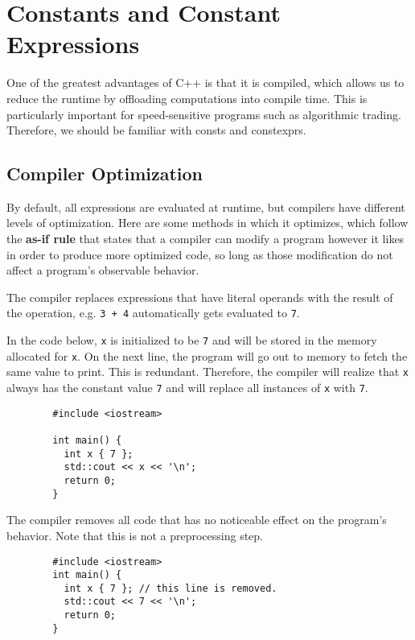 \documentclass{article}
\begin{document}
\section{Constants and Constant Expressions}

    One of the greatest advantages of C++ is that it is compiled, which allows us to reduce the runtime by offloading computations into compile time. This is particularly important for speed-sensitive programs such as algorithmic trading. Therefore, we should be familiar with consts and constexprs. 

  \subsection{Compiler Optimization} 

    By default, all expressions are evaluated at runtime, but compilers have different levels of optimization. Here are some methods in which it optimizes, which follow the \textbf{as-if rule} that states that a compiler can modify a program however it likes in order to produce more optimized code, so long as those modification do not affect a program's observable behavior. 

    \begin{definition} 
      The compiler replaces expressions that have literal operands with the result of the operation, e.g. \texttt{3 + 4} automatically gets evaluated to \texttt{7}. 
    \end{definition}

    \begin{definition}
      In the code below, \texttt{x} is initialized to be \texttt{7} and will be stored in the memory allocated for \texttt{x}. On the next line, the program will go out to memory to fetch the same value to print. This is redundant. Therefore, the compiler will realize that \texttt{x} always has the constant value \texttt{7} and will replace all instances of \texttt{x} with \texttt{7}. 
      \begin{lstlisting}
        #include <iostream>

        int main() {
          int x { 7 };
          std::cout << x << '\n';
          return 0;
        } 
      \end{lstlisting}
    \end{definition}

    \begin{definition}
      The compiler removes all code that has no noticeable effect on the program's behavior. Note that this is not a preprocessing step. 
      \begin{lstlisting}
        #include <iostream>
        int main() {
          int x { 7 }; // this line is removed. 
          std::cout << 7 << '\n';
          return 0;
        } 
      \end{lstlisting}
    \end{definition} 
\end{document}
